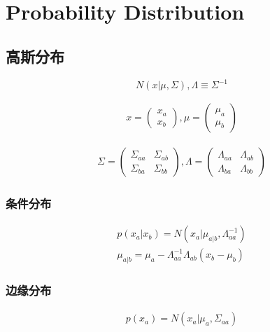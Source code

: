 \chapter{Probability Distribution}
\label{probability_distribution}

\section{高斯分布}
\begin{equation}
N(x|\mu, \Sigma), \Lambda \equiv \Sigma^{-1}
\end{equation}

\begin{equation}
\begin{aligned}
x = \begin{pmatrix}
 x_a\\ 
 x_b
  \end{pmatrix},
\mu = 
\begin{pmatrix}
 \mu_a \\ 
 \mu_b
  \end{pmatrix}
\end{aligned}
\end{equation}

\begin{equation}
\begin{aligned}
\Sigma = \begin{pmatrix}
\Sigma_{aa}&\Sigma_{ab}\\
\Sigma_{ba}&\Sigma_{bb}
\end{pmatrix},
\Lambda = 
\begin{pmatrix}
\Lambda_{aa}& \Lambda_{ab}\\
\Lambda_{ba}& \Lambda_{bb}
\end{pmatrix}
\end{aligned}
\end{equation}

\subsection{条件分布}
\begin{equation}
\begin{aligned}
p(x_a|x_b) = N(x_a|\mu_{a|b}, \Lambda_{aa}^{-1})
\\
\mu_{a|b} = \mu_a - \Lambda_{aa}^{-1}\Lambda_{ab}(x_b - \mu_b)
\end{aligned}
\end{equation}

\subsection{边缘分布}
\begin{equation}
\begin{aligned}
p(x_a) = N(x_a|\mu_a, \Sigma_{aa})
\end{aligned}
\end{equation}

